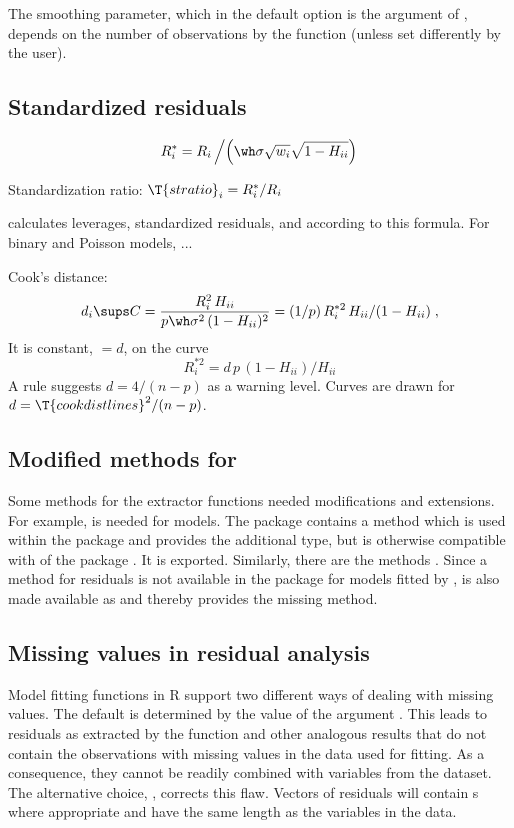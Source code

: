 \documentclass[11pt]{article}\usepackage[]{graphicx}\usepackage[]{color}
\begin{document}
The smoothing parameter, which in the default option is the 
argument of , depends on the number of observations by the function
 (unless set differently by the user).

\subsection{Standardized residuals}

\[
R^*_i=R_i\left/\left(\wh\sigma \sqrt{w_i} \sqrt{1-H_{ii}}\right)\right.
\]

Standardization ratio: 
$\T{stratio}_i=R^*_i/R_i$

 calculates leverages, standardized residuals, and 
according to this formula.
For binary and Poisson models, ...

Cook's distance:
\[
  d_i\sups C=\frac{R_i^2\,H_{ii}}{p\wh\sigma^2\,(1-H_{ii})^2}
  =(1/p)\,R_i^{*2}\,H_{ii}/(1-H_{ii})
  \;,
\]
It is constant, $=d$, on the curve
\[
  R_i^{*2} = d\,p\,(1-H_{ii})/H_{ii}
\]
A rule suggests $d=4/(n-p)$ as a warning level.
Curves are drawn for $d=\T{cookdistlines}^2/(n-p)$.

\subsection{Modified methods for }
%
Some methods for the extractor functions 
needed modifications and extensions.
For example,  is needed for  models.
The package contains a method  which is used within the
package and provides the additional type, but is otherwise compatible with
 of the package . It is exported.
Similarly, there are the methods
.
Since a method for residuals is not available in the  package
for models fitted by , \Hneed{70mm} is also
made available as  and thereby provides the missing
method. 


\subsection{Missing values in residual analysis}
Model fitting functions in R support two different ways of dealing with
missing values. The default is determined by the value 
of the argument . 
This leads to residuals as extracted by the  function
and other analogous results that do not contain the observations with 
missing values in the data used for fitting.
As a consequence, they cannot be readily combined with variables from the
dataset. 
The alternative choice, , corrects this flaw.
Vectors of residuals will contain s where appropriate and have 
the same length as the variables in the data.
\end{document}
